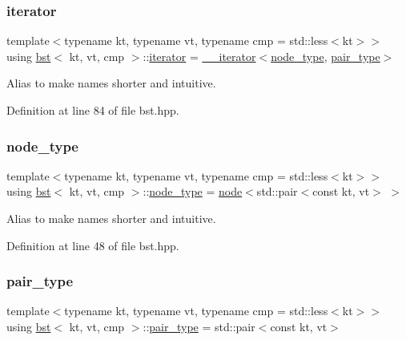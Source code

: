 \mbox{\label{classbst_a429b0445783ff6486882db5dee900ce0}} 
\subsubsection{\texorpdfstring{iterator}{iterator}}
{\footnotesize\ttfamily template$<$typename kt, typename vt, typename cmp = std\+::less$<$kt$>$$>$ \\
using \hyperlink{classbst}{bst}$<$ kt, vt, cmp $>$\+::\hyperlink{classbst_a429b0445783ff6486882db5dee900ce0}{iterator} =  \hyperlink{classbst_1_1____iterator}{\+\_\+\+\_\+iterator}$<$\hyperlink{classbst_a062eb2a1ac54802dbc4f0f74ae2afd01}{node\+\_\+type}, \hyperlink{classbst_a7b11cca2a3b4394915600194f741ab16}{pair\+\_\+type}$>$}

Alias to make names shorter and intuitive. 

Definition at line 84 of file bst.\+hpp.

\mbox{\label{classbst_a062eb2a1ac54802dbc4f0f74ae2afd01}} 
\subsubsection{\texorpdfstring{node\+\_\+type}{node\_type}}
{\footnotesize\ttfamily template$<$typename kt, typename vt, typename cmp = std\+::less$<$kt$>$$>$ \\
using \hyperlink{classbst}{bst}$<$ kt, vt, cmp $>$\+::\hyperlink{classbst_a062eb2a1ac54802dbc4f0f74ae2afd01}{node\+\_\+type} =  \hyperlink{structbst_1_1node}{node}$<$std\+::pair$<$const kt, vt$>$ $>$\hspace{0.3cm}{\ttfamily [private]}}

Alias to make names shorter and intuitive. 

Definition at line 48 of file bst.\+hpp.

\mbox{\label{classbst_a7b11cca2a3b4394915600194f741ab16}} 
\subsubsection{\texorpdfstring{pair\+\_\+type}{pair\_type}}
{\footnotesize\ttfamily template$<$typename kt, typename vt, typename cmp = std\+::less$<$kt$>$$>$ \\
using \hyperlink{classbst}{bst}$<$ kt, vt, cmp $>$\+::\hyperlink{classbst_a7b11cca2a3b4394915600194f741ab16}{pair\+\_\+type} =  std\+::pair$<$const kt, vt$>$}

